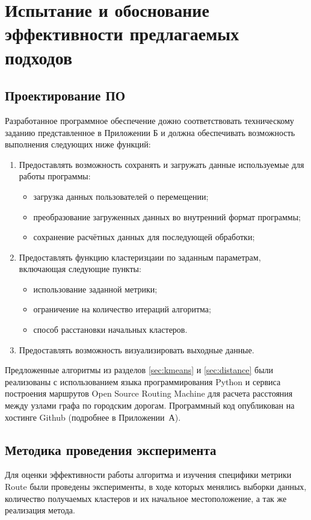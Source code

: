 \chapter{Испытание и обоснование эффективности предлагаемых подходов}
\section{Проектирование ПО}
Разработанное программное обеспечение дожно соответствовать техническому заданию представленное в Приложении Б и должна обеспечивать возможность выполнения следующих ниже функций:
\begin{enumerate}
    \item Предоставлять возможность сохранять и загружать данные используемые для работы программы:
    \begin{itemize}
        \item загрузка данных пользователей о перемещении;
        \item преобразование загруженных данных во внутренний формат программы;
        \item сохранение расчётных данных для последующей обработки;
    \end{itemize}
    \item Предоставлять функцию кластеризцаии по заданным параметрам, включающая следующие пункты:
    \begin{itemize}
        \item использование заданной метрики;
        \item ограничение на количество итераций алгоритма;
        \item способ расстановки начальных кластеров.
    \end{itemize}
    \item Предоставлять возможность визуализировать выходные данные.
\end{enumerate}

Предложенные алгоритмы из разделов \ref{sec:kmeans} и \ref{sec:distance} были реализованы с использованием языка программирования Python и сервиса построения маршрутов Open Source Routing Machine для расчета расстояния между узлами графа по городским дорогам. Программный код опубликован на хостинге Github (подробнее в Приложении~А).

\section{Методика проведения эксперимента}
Для оценки эффективности работы алгоритма и изучения специфики метрики Route были проведены эксперименты, в ходе которых менялись выборки данных, количество получаемых кластеров и их начальное местоположение, а так же реализация метода.

